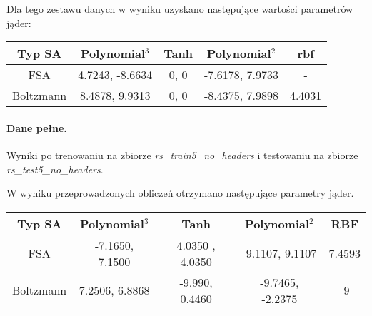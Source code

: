\documentclass{article}
\begin{document}
Dla tego zestawu danych w wyniku uzyskano następujące wartości parametrów jąder:

\begin{center}
    \begin{tabular}{ | c | c | c | c | c | }
    \hline
    Typ SA & \textbf{Polynomial}$^{3}$ & \textbf{Tanh} & \textbf{Polynomial$^{2}$} & \textbf{rbf} \\ \hline
    FSA & 4.7243, -8.6634 & 0, 0 & -7.6178, 7.9733 & - \\ \hline
   Boltzmann & 8.4878, 9.9313 & 0, 0 & -8.4375, 7.9898 & 4.4031\\ \hline
    \end{tabular}
\end{center}

\paragraph {Dane pełne.}
Wyniki po trenowaniu na zbiorze \textit{rs\_train5\_no\_headers} i testowaniu na zbiorze \textit{rs\_test5\_no\_headers}.
\pgfplotsset{width=7cm,compat=1.4}
\begin{center}
\end{center}

W wyniku przeprowadzonych obliczeń otrzymano następujące parametry jąder.
\begin{center}
    \begin{tabular}{ | c | c | c | c | c | }
    \hline
    Typ SA & \textbf{Polynomial}$^{3}$ & \textbf{Tanh} & \textbf{Polynomial$^{2}$} & \textbf{RBF} \\ \hline
    FSA & -7.1650, 7.1500 & 4.0350 , 4.0350 & -9.1107, 9.1107 & 7.4593  \\ \hline
   Boltzmann & 7.2506, 6.8868 & -9.990, 0.4460 & -9.7465, -2.2375 & -9\\ \hline
    \end{tabular}
\end{center}
\end{document}
